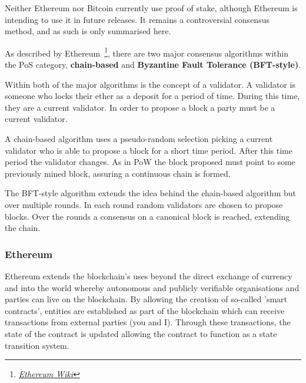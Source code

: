 Neither Ethereum nor Bitcoin currently use proof of stake, although Ethereum is intending to use it in future releases. It remains a controversial consensus method, and as such is only summarised here.

As described by Ethereum~\footnote{\href{https://github.com/ethereum/wiki/wiki}{\textit{Ethereum Wiki}}}, there are two major consensus algorithms within the PoS category, \textbf{chain-based} and \textbf{Byzantine Fault Tolerance (BFT-style)}.

Within both of the major algorithms is the concept of a validator. A validator is someone who locks their ether as a deposit for a period of time. During this time, they are a current validator. In order to propose a block a party must be a current validator.

A chain-based algorithm uses a pseudo-random selection picking a current validator who is able to propose a block for a short time period. After this time period the validator changes. As in PoW the block proposed must point to some previously mined block, assuring a continuous chain is formed.

The BFT-style algorithm extends the idea behind the chain-based algorithm but over multiple rounds. In each round random validators are chosen to propose blocks. Over the rounds a consensus on a canonical block is reached, extending the chain.




\subsubsection{Ethereum}

Ethereum extends the blockchain's uses beyond the direct exchange of currency and into the world whereby autonomous and publicly verifiable organisations and parties can live on the blockchain. By allowing the creation of so-called 'smart contracts', entities are established as part of the blockchain which can receive transactions from external parties (you and I). Through these transactions, the state of the contract is updated allowing the contract to function as a state transition system.

